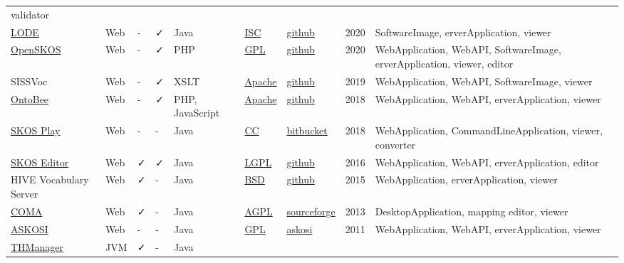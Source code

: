 \documentclass[
  DIV=10]{article}
\begin{document}
\begin{longtable}[]{@{}lllllllll@{}}
validator \\
\href{https://essepuntato.it/lode/}{LODE} & Web & - & ✓ & Java &
\href{https://spdx.org/licenses/ISC}{ISC} &
\href{https://github.com/essepuntato/LODE}{github} & 2020 &
SoftwareImage, erverApplication, viewer \\
\href{http://openskos.org/}{OpenSKOS} & Web & - & ✓ & PHP &
\href{https://spdx.org/licenses/GPL-3.0-or-later}{GPL} &
\href{https://github.com/OpenSKOS/OpenSKOS}{github} & 2020 &
WebApplication, WebAPI, SoftwareImage, erverApplication, viewer,
editor \\
SISSVoc & Web & - & ✓ & XSLT &
\href{https://spdx.org/licenses/Apache-2.0}{Apache} &
\href{https://github.com/SISS/sissvoc}{github} & 2019 & WebApplication,
WebAPI, SoftwareImage, viewer \\
\href{https://ontobee.org/}{OntoBee} & Web & - & ✓ & PHP, JavaScript &
\href{https://spdx.org/licenses/Apache-2.0}{Apache} &
\href{https://github.com/OntoZoo/ontobee}{github} & 2018 &
WebApplication, WebAPI, erverApplication, viewer \\
\href{https://skos-play.sparna.fr/play/about}{SKOS Play} & Web & - & - &
Java & \href{https://spdx.org/licenses/CC-BY-SA-4.0}{CC} &
\href{https://bitbucket.org/tfrancart/sparna/src/master/}{bitbucket} &
2018 & WebApplication, CommandLineApplication, viewer, converter \\
\href{https://jbiomedsem.biomedcentral.com/articles/10.1186/s13326-015-0043-z}{SKOS
Editor} & Web & ✓ & ✓ & Java &
\href{https://spdx.org/licenses/LGPL-3.0-or-later}{LGPL} &
\href{https://github.com/Blulab-Utah/SKOSEditor}{github} & 2016 &
WebApplication, WebAPI, erverApplication, editor \\
HIVE Vocabulary Server & Web & ✓ & - & Java &
\href{https://spdx.org/licenses/BSD-3-Clause}{BSD} &
\href{https://github.com/MetadataResearchCenter/hive-mrc}{github} & 2015
& WebApplication, erverApplication, viewer \\
\href{https://sourceforge.net/projects/coma-ce/files/}{COMA} & Web & ✓ &
- & Java & \href{https://spdx.org/licenses/AGPL-3.0-or-later}{AGPL} &
\href{https://sourceforge.net/projects/coma-ce/}{sourceforge} & 2013 &
DesktopApplication, mapping editor, viewer \\
\href{http://www.askosi.org/}{ASKOSI} & Web & - & - & Java &
\href{https://spdx.org/licenses/GPL-3.0-or-later}{GPL} &
\href{http://www.askosi.org/example/}{askosi} & 2011 & WebApplication,
WebAPI, erverApplication, viewer \\
\href{https://thmanager.sourceforge.io/}{THManager} & JVM & ✓ & - & Java

\end{longtable}
\end{document}
